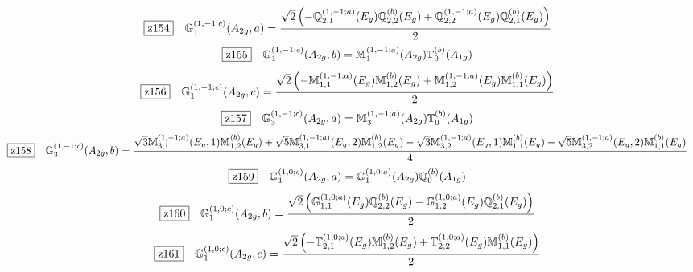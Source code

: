\documentclass[fleqn,10pt,landscape]{jsarticle}
\begin{document}
\begin{dmath*}
\hspace*{3mm}\fbox{z154}\quad \mathbb{G}_{1}^{(1,-1;c)}(A_{2g},a)=\frac{\sqrt{2} \left(- \mathbb{Q}_{2,1}^{(1,-1;a)}(E_{g}) \mathbb{Q}_{2,2}^{(b)}(E_{g}) + \mathbb{Q}_{2,2}^{(1,-1;a)}(E_{g}) \mathbb{Q}_{2,1}^{(b)}(E_{g})\right)}{2}
\end{dmath*}
\begin{dmath*}
\hspace*{3mm}\fbox{z155}\quad \mathbb{G}_{1}^{(1,-1;c)}(A_{2g},b)=\mathbb{M}_{1}^{(1,-1;a)}(A_{2g}) \mathbb{T}_{0}^{(b)}(A_{1g})
\end{dmath*}
\begin{dmath*}
\hspace*{3mm}\fbox{z156}\quad \mathbb{G}_{1}^{(1,-1;c)}(A_{2g},c)=\frac{\sqrt{2} \left(- \mathbb{M}_{1,1}^{(1,-1;a)}(E_{g}) \mathbb{M}_{1,2}^{(b)}(E_{g}) + \mathbb{M}_{1,2}^{(1,-1;a)}(E_{g}) \mathbb{M}_{1,1}^{(b)}(E_{g})\right)}{2}
\end{dmath*}
\begin{dmath*}
\hspace*{3mm}\fbox{z157}\quad \mathbb{G}_{3}^{(1,-1;c)}(A_{2g},a)=\mathbb{M}_{3}^{(1,-1;a)}(A_{2g}) \mathbb{T}_{0}^{(b)}(A_{1g})
\end{dmath*}
\begin{dmath*}
\hspace*{3mm}\fbox{z158}\quad \mathbb{G}_{3}^{(1,-1;c)}(A_{2g},b)=\frac{\sqrt{3} \mathbb{M}_{3,1}^{(1,-1;a)}(E_{g},1) \mathbb{M}_{1,2}^{(b)}(E_{g}) + \sqrt{5} \mathbb{M}_{3,1}^{(1,-1;a)}(E_{g},2) \mathbb{M}_{1,2}^{(b)}(E_{g}) - \sqrt{3} \mathbb{M}_{3,2}^{(1,-1;a)}(E_{g},1) \mathbb{M}_{1,1}^{(b)}(E_{g}) - \sqrt{5} \mathbb{M}_{3,2}^{(1,-1;a)}(E_{g},2) \mathbb{M}_{1,1}^{(b)}(E_{g})}{4}
\end{dmath*}
\begin{dmath*}
\hspace*{3mm}\fbox{z159}\quad \mathbb{G}_{1}^{(1,0;c)}(A_{2g},a)=\mathbb{G}_{1}^{(1,0;a)}(A_{2g}) \mathbb{Q}_{0}^{(b)}(A_{1g})
\end{dmath*}
\begin{dmath*}
\hspace*{3mm}\fbox{z160}\quad \mathbb{G}_{1}^{(1,0;c)}(A_{2g},b)=\frac{\sqrt{2} \left(\mathbb{G}_{1,1}^{(1,0;a)}(E_{g}) \mathbb{Q}_{2,2}^{(b)}(E_{g}) - \mathbb{G}_{1,2}^{(1,0;a)}(E_{g}) \mathbb{Q}_{2,1}^{(b)}(E_{g})\right)}{2}
\end{dmath*}
\begin{dmath*}
\hspace*{3mm}\fbox{z161}\quad \mathbb{G}_{1}^{(1,0;c)}(A_{2g},c)=\frac{\sqrt{2} \left(- \mathbb{T}_{2,1}^{(1,0;a)}(E_{g}) \mathbb{M}_{1,2}^{(b)}(E_{g}) + \mathbb{T}_{2,2}^{(1,0;a)}(E_{g}) \mathbb{M}_{1,1}^{(b)}(E_{g})\right)}{2}
\end{dmath*}
\end{document}
